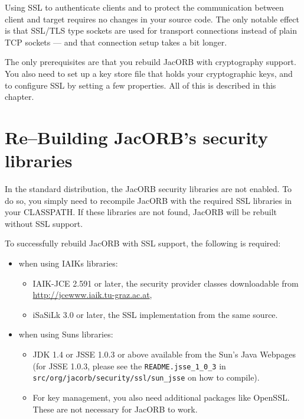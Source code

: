 

Using  SSL to authenticate  clients and  to protect  the communication
between client and target requires no changes in your source code. The
only  notable  effect  is  that  SSL/TLS type  sockets  are  used  for
transport  connections  instead of  plain  TCP  sockets  --- and  that
connection setup takes a bit longer.

The only  prerequisites are that you rebuild  JacORB with cryptography
support. You  also need  to set up  a key  store file that  holds your
cryptographic   keys,  and  to   configure  SSL   by  setting   a  few
properties. All of this is described in this chapter.

\section{Re--Building JacORB's security libraries}

In the  standard distribution, the  JacORB security libraries  are not
enabled.   To do  so, you  simply need  to recompile  JacORB  with the
required SSL libraries  in your CLASSPATH.  If these libraries
are not found, JacORB will be rebuilt without SSL support.

To  successfully rebuild  JacORB with  SSL support,  the  following is
required:

\begin{itemize}
        \item when using IAIKs libraries:
              \begin{itemize}
                \item IAIK-JCE 2.591 or later, the security provider classes
                downloadable from \\ \href{http://jcewww.iaik.tu-graz.ac.at}{http://jcewww.iaik.tu-graz.ac.at},
              \item iSaSiLk 3.0 or later, the SSL implementation from the same
                source.
              \end{itemize}

        \item when using Suns libraries:
              \begin{itemize}
              \item JDK 1.4 or JSSE 1.0.3 or above available from the
                Sun's Java Webpages (for JSSE 1.0.3, please see the
                {\tt README.jsse\_1\_0\_3} in 
                {\tt src/org/jacorb/security/ssl/sun\_jsse} on how to compile).
              \item For key management, you also need additional packages like
                OpenSSL. These are not necessary for JacORB to work.
              \end{itemize}
\end{itemize}

